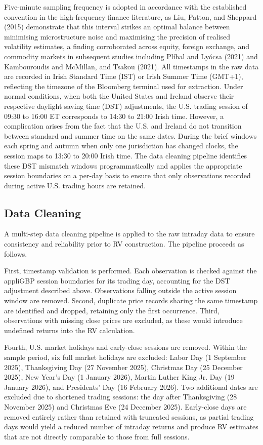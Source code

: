 \documentclass[12pt,a4paper]{report}
\begin{document}
Five-minute sampling frequency is adopted in accordance with the established convention in the high-frequency finance literature, as Liu, Patton, and Sheppard (2015) demonstrate that this interval strikes an optimal balance between minimising microstructure noise and maximising the precision of realised volatility estimates, a finding corroborated across equity, foreign exchange, and commodity markets in subsequent studies including Plíhal and Lyócsa (2021) and Kambouroudis and McMillan, and Tsakou (2021).
All timestamps in the raw data are recorded in Irish Standard Time (IST) or Irish Summer Time (GMT+1), reflecting the timezone of the Bloomberg terminal used for extraction. Under normal conditions, when both the United States and Ireland observe their respective daylight saving time (DST) adjustments, the U.S. trading session of 09:30 to 16:00 ET corresponds to 14:30 to 21:00 Irish time. However, a complication arises from the fact that the U.S. and Ireland do not transition between standard and summer time on the same dates. During the brief windows each spring and autumn when only one jurisdiction has changed clocks, the session maps to 13:30 to 20:00 Irish time. The data cleaning pipeline identifies these DST mismatch windows programmatically and applies the appropriate session boundaries on a per-day basis to ensure that only observations recorded during active U.S. trading hours are retained.


\subsection{Data Cleaning}
A multi-step data cleaning pipeline is applied to the raw intraday data to ensure consistency and reliability prior to RV construction. The pipeline proceeds as follows.

First, timestamp validation is performed. Each observation is checked against the appliGBP session boundaries for its trading day, accounting for the DST adjustment described above. Observations falling outside the active session window are removed. Second, duplicate price records sharing the same timestamp are identified and dropped, retaining only the first occurrence. Third, observations with missing close prices are excluded, as these would introduce undefined returns into the RV calculation.

Fourth, U.S. market holidays and early-close sessions are removed. Within the sample period, six full market holidays are excluded: Labor Day (1 September 2025), Thanksgiving Day (27 November 2025), Christmas Day (25 December 2025), New Year's Day (1 January 2026), Martin Luther King Jr. Day (19 January 2026), and Presidents' Day (16 February 2026). Two additional dates are excluded due to shortened trading sessions: the day after Thanksgiving (28 November 2025) and Christmas Eve (24 December 2025). Early-close days are removed entirely rather than retained with truncated sessions, as partial trading days would yield a reduced number of intraday returns and produce RV estimates that are not directly comparable to those from full sessions.
\end{document}
